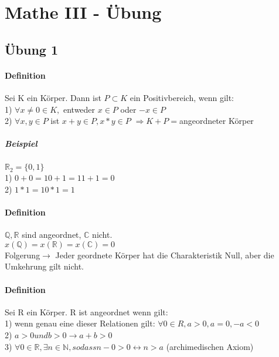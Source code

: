 \documentclass[10pt,a4paper]{scrartcl}
\begin{document}
\section*{Mathe III - Übung}

\subsection*{Übung 1}

\paragraph*{Definition}
\begin{tabbing}
Sei K ein Körper. Dann ist $P\subset K$ ein Positivbereich, wenn gilt:\\
1) $ \forall x \neq 0\in K,$ entweder $x\in P$ oder $-x\in P$\\
2) $\forall x,y\in P$ ist $x + y\in P, x * y\in P$ $\Rightarrow K + P = $angeordneter 					Körper
\end{tabbing}
	
\subparagraph*{Beispiel} 
\begin{tabbing}
$\mathbb{R}_{2}=\{0,1\}$\\
1) $0 + 0=1 0 + 1=1 1 + 1=0$\\ 
2) $1 * 1=1 0 * 1=1$\\	
\end{tabbing}

\paragraph*{Definition}
\begin{tabbing}
$\mathbb{Q},\mathbb{R}$ sind angeordnet, $\mathbb{C}$ nicht.\\
$x(\mathbb{Q})=x(\mathbb{R})=x(\mathbb{C})=0$\\
Folgerung$\rightarrow$ Jeder geordnete Körper hat die Charakteristik Null, aber die Umkehrung gilt nicht. 
\end{tabbing}
	
\paragraph*{Definition}
\begin{tabbing}
Sei R ein Körper. R ist angeordnet wenn  gilt:\\
1) wenn genau eine dieser Relationen gilt: $\forall 0\in R, a > 0, a = 0, -a < 0$\\
2) $a > 0 und b > 0\rightarrow a + b > 0$\\
3) $\forall 0\in \mathbb{R}, \exists n\in \mathbb{N}, sodass n - 0 > 0 \leftrightarrow n > a$ (archimedischen Axiom)\\
\end{tabbing}	
\end{document}
